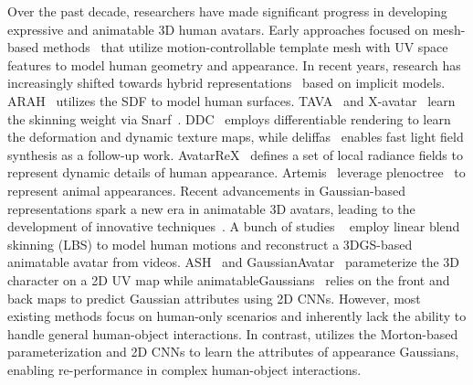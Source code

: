   

Over the past decade, researchers have made significant progress in developing expressive and animatable 3D human avatars.
Early approaches focused on mesh-based methods~\cite{bagautdinov2021driving,xiang2022dressing,xiang2021modeling,halimi2022pattern,casas20144d,shysheya2019textured, deepcap, MonoPerfCap} that utilize motion-controllable template mesh with UV space features to model human geometry and appearance. 
In recent years, research has increasingly shifted towards hybrid representations~\cite{zhu2023trihuman, habermann2023hdhumans} based on implicit models. ARAH~\cite{ARAH:ECCV:2022} utilizes the SDF to model human surfaces. TAVA~\cite{li2022tava} and X-avatar~\cite{shen2023x} learn the skinning weight via Snarf~\cite{chen2021snarf}. DDC~\cite{habermann2021real} employs differentiable rendering to learn the deformation and dynamic texture maps, while deliffas~\cite{kwon2023deliffas} enables fast light field synthesis as a follow-up work. AvatarReX~\cite{zheng2023avatarrex} defines a set of local radiance fields to represent dynamic details of human appearance. Artemis~\cite{luo2022artemis} leverage plenoctree~\cite{yu2021plenoctrees} to represent animal appearances. 
Recent advancements in Gaussian-based representations spark a new era in animatable 3D avatars, leading to the development of innovative techniques~\cite{li2024animatablegaussians, pang2024ash, li2024gaussianbody, qian2023gaussianavatars, chen2024egoavatar, zielonka25dega, rong2024gaussian, zheng2024ohta, zheng2024headgap}.
A bunch of studies
~\cite{lei2024gart,qian20243dgs,hu2023gauhuman} employ linear blend skinning (LBS) to model human motions and reconstruct a 3DGS-based animatable avatar from videos. ASH~\cite{pang2024ash} and GaussianAvatar~\cite{hu2024gaussianavatar} parameterize the 3D character on a 2D UV map while animatableGaussians~\cite{li2024animatablegaussians} relies on the front and back maps to predict Gaussian attributes using 2D CNNs. However, most existing methods focus on human-only scenarios and inherently lack the ability to handle general human-object interactions. In contrast, \methodterm utilizes the Morton-based parameterization and 2D CNNs to learn the attributes of appearance Gaussians, enabling re-performance in complex human-object interactions. 















